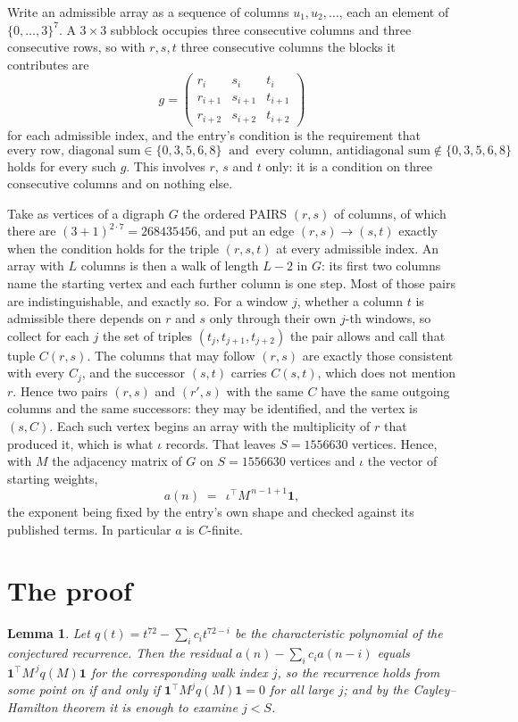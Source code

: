 \documentclass[11pt,a4paper]{article}
\theoremstyle{plain}
\newtheorem{lemma}[theorem]{Lemma}
\theoremstyle{definition}
\begin{document}
Write an admissible array as a sequence of columns $u_1,u_2,\dots$, each an element of
$\{0,\dots,3\}^{7}$. A $3\times3$ subblock occupies three consecutive columns and
three consecutive rows, so with $r,s,t$ three consecutive columns the blocks it
contributes are
\[
g=\begin{pmatrix}r_i&s_i&t_i\\ r_{i+1}&s_{i+1}&t_{i+1}\\ r_{i+2}&s_{i+2}&t_{i+2}\end{pmatrix}
\]
for each admissible index, and the entry's condition is the requirement that
\[
\text{every row, diagonal sum} \in \{0,3,5,6,8\}\ \text{ and }\ \text{every column, antidiagonal sum} \notin \{0,3,5,6,8\}
\]
holds for every such $g$. This involves $r$, $s$ and $t$ only: it is a condition on
three consecutive columns and on nothing else.

Take as vertices of a digraph $G$ the ordered PAIRS $(r,s)$ of columns, of which there are
$(3+1)^{2\cdot7}=268435456$, and put an edge $(r,s)\to(s,t)$ exactly when the condition
holds for the triple $(r,s,t)$ at every admissible index. An array with $L$ columns is then a
walk of length $L-2$ in $G$: its first two columns name the starting vertex and each further
column is one step. Most of those pairs are indistinguishable, and exactly so. For a window $j$, whether a column $t$ is admissible there depends on $r$ and $s$ only through their own $j$-th windows, so collect for each $j$ the set of triples $(t_j,t_{j+1},t_{j+2})$ the pair allows and call that tuple $C(r,s)$. The columns that may follow $(r,s)$ are exactly those consistent with every $C_j$, and the successor $(s,t)$ carries $C(s,t)$, which does not mention $r$. Hence two pairs $(r,s)$ and $(r',s)$ with the same $C$ have the same outgoing columns and the same successors: they may be identified, and the vertex is $(s,C)$. Each such vertex begins an array with the multiplicity of $r$ that produced it, which is what $\iota$ records. That leaves $S=1556630$ vertices. Hence, with $M$ the adjacency matrix of $G$ on $S=1556630$ vertices and
$\iota$ the vector of starting weights,
\[
a(n)\;=\;\,\iota^{\!\top}M^{\,n-1+1}\mathbf{1},
\]
the exponent being fixed by the entry's own shape and checked against its published terms.
In particular $a$ is $C$-finite.

\section{The proof}

\begin{lemma}\label{lem:crit}
Let $q(t)=t^{72}-\sum_i c_it^{72-i}$ be the characteristic polynomial of the
conjectured recurrence. Then the residual $a(n)-\sum_ic_ia(n-i)$ equals
$\mathbf{1}^{\!\top}M^{\,j}q(M)\mathbf{1}$ for the corresponding walk index
$j$, so the recurrence holds from some point on if and only if
$\mathbf{1}^{\!\top}M^{j}q(M)\mathbf{1}=0$ for all large $j$; and by the
Cayley--Hamilton theorem it is enough to examine $j<S$.
\end{lemma}
\end{document}

